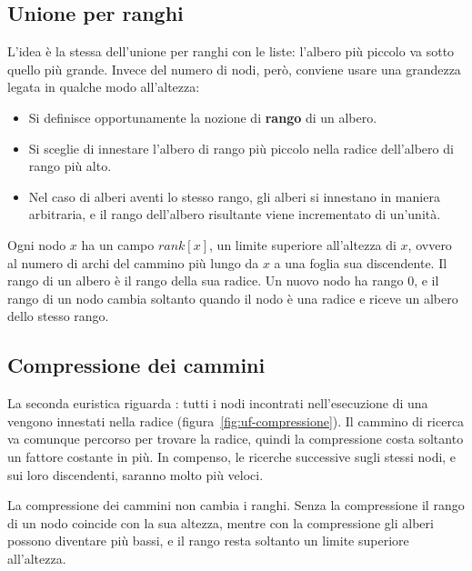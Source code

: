 \subsection{Unione per ranghi}\label{sec:uf-ranghi}
L'idea è la stessa dell'unione per ranghi con le liste: l'albero più piccolo va sotto quello più grande. Invece del numero di nodi, però, conviene usare una grandezza legata in qualche modo all'altezza:
\begin{itemize}
    \item Si definisce opportunamente la nozione di \textbf{rango} di un albero.
    \item Si sceglie di innestare l'albero di rango più piccolo nella radice dell'albero di rango più alto.
    \item Nel caso di alberi aventi lo stesso rango, gli alberi si innestano in maniera arbitraria, e il rango dell'albero risultante viene incrementato di un'unità.
\end{itemize}

Ogni nodo $x$ ha un campo $\mathit{rank}[x]$, un limite superiore all'altezza di $x$, ovvero al numero di archi del cammino più lungo da $x$ a una foglia sua discendente. Il rango di un albero è il rango della sua radice. Un nuovo nodo ha rango $0$, e il rango di un nodo cambia soltanto quando il nodo è una radice e riceve un albero dello stesso rango.

\subsection{Compressione dei cammini}\label{sec:uf-compressione}
La seconda euristica riguarda \FindSet{}: tutti i nodi incontrati nell'esecuzione di una \FindSet{} vengono innestati nella radice (figura~\ref{fig:uf-compressione}). Il cammino di ricerca va comunque percorso per trovare la radice, quindi la compressione costa soltanto un fattore costante in più. In compenso, le ricerche successive sugli stessi nodi, e sui loro discendenti, saranno molto più veloci.

La compressione dei cammini non cambia i ranghi. Senza la compressione il rango di un nodo coincide con la sua altezza, mentre con la compressione gli alberi possono diventare più bassi, e il rango resta soltanto un limite superiore all'altezza.

